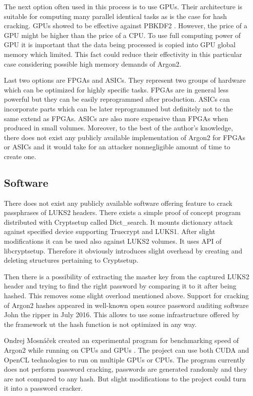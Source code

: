 \documentclass[nolof]{fithesis3}
\begin{document}
The next option often used in this process is to use GPUs. Their architecture is suitable for computing many parallel identical tasks as is the case for hash cracking. GPUs showed to be effective against PBKDF2 \parencite{mosnacek}. However, the price of a GPU might be higher than the price of a CPU. To use full computing power of GPU it is important that the data being processed is copied into GPU global memory which limited. This fact could  reduce their effectivity in this particular case considering possible high memory demands of Argon2.

Last two options are FPGAs and ASICs. They represent two groups of hardware which can be optimized for highly specific tasks. FPGAs are in general less powerful but they can be easily reprogrammed after production. ASICs can incorporate parts which can be later reprogrammed but definitely not to the same extend as FPGAs. ASICs are also more expensive than FPGAs when produced in small volumes. Moreover, to the best of the author's knowledge, there does not exist any publicly available implementation of Argon2 for FPGAs or ASICs and it would take for an attacker nonnegligible amount of time to create one.

\subsection{Software}
There does not exist any publicly available software offering feature to crack passphrases of LUKS2 headers. There exists a simple proof of concept program distributed with Cryptsetup called Dict\_search. It mounts dictionary attack against specified device supporting Truecrypt and LUKS1. After slight modifications it can be used also against LUKS2 volumes. It uses API of libcryptsetup. Therefore it obviously introduces slight overhead by creating and deleting structures pertaining to Cryptsetup.

Then there is a possibility of extracting the master key from the captured LUKS2 header and trying to find the right password by comparing it to it after being hashed. This removes some slight overload mentioned above. Support for cracking of Argon2 hashes appeared in well-known open source password auditing software John the ripper in July 2016. This allows to use some infrastructure offered by the framework ut the hash function is not optimized in any way.

Ondrej Mosnáček created an experimental program for benchmarking speed of Argon2 while running on CPUs and GPUs \parencite{argon2gpu}. The project can use both CUDA and OpenCL technologies to run on multiple GPUs or CPUs. The program currently does not perform password cracking, passwords are generated randomly and they are not compared to any hash. But slight modifications to the project could turn it into a password cracker.
\end{document}
